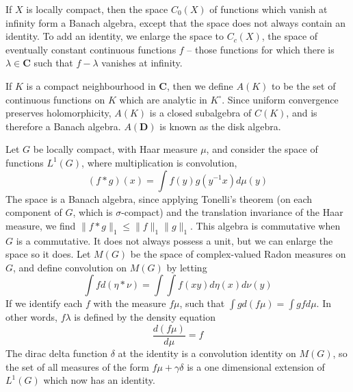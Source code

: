 \begin{example}
    If $X$ is locally compact, then the space $C_0(X)$ of functions which vanish at infinity form a Banach algebra, except that the space does not always contain an identity. To add an identity, we enlarge the space to $C_c(X)$, the space of eventually constant continuous functions $f$ -- those functions for which there is $\lambda \in \mathbf{C}$ such that $f - \lambda$ vanishes at infinity.
\end{example}

\begin{example}
    If $K$ is a compact neighbourhood in $\mathbf{C}$, then we define $A(K)$ to be the set of continuous functions on $K$ which are analytic in $K^\circ$. Since uniform convergence preserves holomorphicity, $A(K)$ is a closed subalgebra of $C(K)$, and is therefore a Banach algebra. $A(\mathbf{D})$ is known as the disk algebra.
\end{example}

\begin{example}
    Let $G$ be locally compact, with Haar measure $\mu$, and consider the space of functions $L^1(G)$, where multiplication is convolution,
    \[ (f * g)(x) = \int f(y) g(y^{-1}x) d\mu(y) \]
    The space is a Banach algebra, since applying Tonelli's theorem (on each component of $G$, which is $\sigma$-compact) and the translation invariance of the Haar measure, we find $\| f * g \|_1 \leq \| f \|_1 \| g \|_1$. This algebra is commutative when $G$ is a commutative. It does not always possess a unit, but we can enlarge the space so it does. Let $M(G)$ be the space of complex-valued Radon measures on $G$, and define convolution on $M(G)$ by letting
    \[ \int f d (\eta * \nu) = \int \int f(xy) d\eta(x) d\nu(y) \]
    If we identify each $f$ with the measure $f \mu$, such that $\int g d(f \mu) = \int g f d\mu$. In other words, $f \lambda$ is defined by the density equation
    \[ \frac{d(f \mu)}{d \mu} = f \]
    The dirac delta function $\delta$ at the identity is a convolution identity on $M(G)$, so the set of all measures of the form $f \mu + \gamma \delta$ is a one dimensional extension of $L^1(G)$ which now has an identity.
\end{example}

